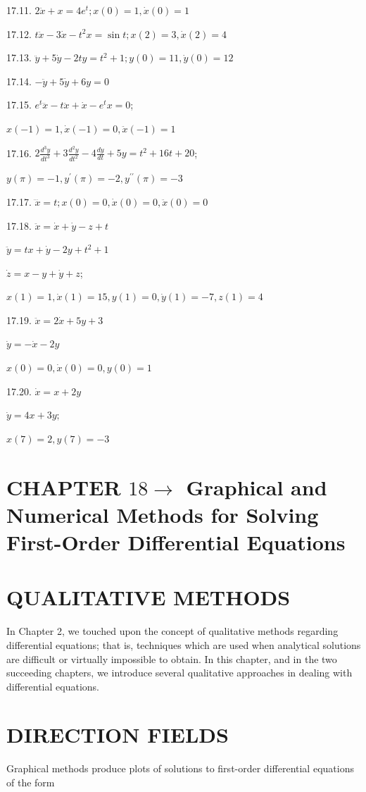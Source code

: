 \documentclass[10pt]{article}
\begin{document}
17.11. $2 \ddot{x}+x=4 e^{t} ; x(0)=1, \dot{x}(0)=1$

17.12. $t \ddot{x}-3 \dot{x}-t^{2} x=\sin t ; x(2)=3, \dot{x}(2)=4$

17.13. $\ddot{y}+5 \dot{y}-2 t y=t^{2}+1 ; y(0)=11, \dot{y}(0)=12$

17.14. $-\ddot{y}+5 \dot{y}+6 y=0$

17.15. $e^{t} \dddot{x}-t \ddot{x}+\dot{x}-e^{t} x=0$;

$x(-1)=1, \dot{x}(-1)=0, \ddot{x}(-1)=1$

17.16. $2 \frac{d^{3} y}{d t^{3}}+3 \frac{d^{2} y}{d t^{2}}-4 \frac{d y}{d t}+5 y=t^{2}+16 t+20$;

$y(\pi)=-1, y^{\prime}(\pi)=-2, y^{\prime \prime}(\pi)=-3$

17.17. $\dddot{x}=t ; x(0)=0, \dot{x}(0)=0, \ddot{x}(0)=0$

17.18. $\ddot{x}=\dot{x}+\dot{y}-z+t$

$\ddot{y}=t x+\dot{y}-2 y+t^{2}+1$

$\dot{z}=x-y+\dot{y}+z$;

$x(1)=1, \dot{x}(1)=15, y(1)=0, \dot{y}(1)=-7, z(1)=4$

17.19. $\ddot{x}=2 \dot{x}+5 y+3$

$\dot{y}=-\dot{x}-2 y$

$x(0)=0, \dot{x}(0)=0, y(0)=1$

17.20. $\dot{x}=x+2 y$

$\dot{y}=4 x+3 y ;$

$x(7)=2, y(7)=-3$

\section*{CHAPTER $18 \longrightarrow$ Graphical and Numerical Methods for Solving First-Order Differential Equations}
\section*{QUALITATIVE METHODS}
In Chapter 2, we touched upon the concept of qualitative methods regarding differential equations; that is, techniques which are used when analytical solutions are difficult or virtually impossible to obtain. In this chapter, and in the two succeeding chapters, we introduce several qualitative approaches in dealing with differential equations.

\section*{DIRECTION FIELDS}
Graphical methods produce plots of solutions to first-order differential equations of the form
\end{document}
